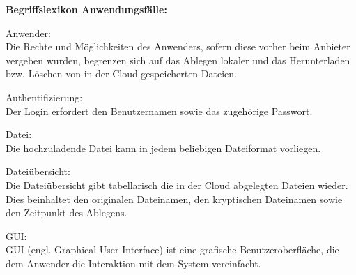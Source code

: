 \documentclass[12pt,a4paper,bibliography=totocnumbered,listof=totocnumbered]{scrartcl}
\begin{document}
\textbf{Begriffslexikon Anwendungsfälle:}
\begin{compactitem}
\item Anwender:\\
Die Rechte und Möglichkeiten des Anwenders, sofern diese vorher beim Anbieter vergeben wurden, begrenzen sich auf das Ablegen lokaler und das Herunterladen bzw. Löschen von in der Cloud gespeicherten Dateien.
\item Authentifizierung:\\
Der Login erfordert den Benutzernamen sowie das zugehörige Passwort.
\item Datei:\\
Die hochzuladende Datei kann in jedem beliebigen Dateiformat vorliegen.
\item Dateiübersicht:\\
Die Dateiübersicht gibt tabellarisch die in der Cloud abgelegten Dateien wieder. Dies beinhaltet den originalen Dateinamen, den kryptischen Dateinamen  sowie den Zeitpunkt des Ablegens.
\item GUI:\\
GUI (engl. Graphical User Interface) ist eine grafische Benutzeroberfläche, die dem Anwender die Interaktion mit dem System vereinfacht.
\end{compactitem}
\pagebreak
\end{document}
